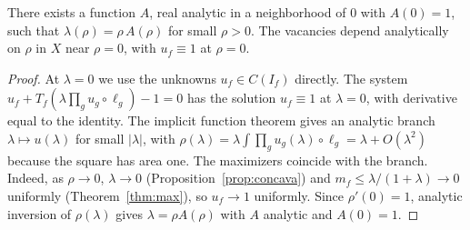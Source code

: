 \begin{proposicion}\label{prop:diluido} There exists a function $A$, real analytic in a neighborhood of $0$ with
$A(0)=1$, such that $\lambda(\rho)=\rho\,A(\rho)$ for small $\rho>0$. The vacancies depend analytically on $\rho$ in $X$ near $\rho=0$,
with $u_f\equiv1$ at $\rho=0$. \end{proposicion}

\begin{proof} At $\lambda=0$ we use the unknowns $u_f\in C(I_f)$ directly. The system $u_f+T_f(\lambda\prod_gu_g\circ\ell_g)-1=0$ has
the solution $u_f\equiv1$ at $\lambda=0$, with derivative equal to the identity. The implicit function theorem gives an analytic branch
$\lambda\mapsto u(\lambda)$ for small $|\lambda|$, with $\rho(\lambda)=\lambda\int\prod_gu_g(\lambda)\circ\ell_g=\lambda+O(\lambda^2)$
because the square has area one. The maximizers coincide with the branch. Indeed, as $\rho\to0$, $\lambda\to0$
(Proposition~\ref{prop:concava}) and $m_f\le\lambda/(1+\lambda)\to0$ uniformly (Theorem~\ref{thm:max}), so $u_f\to1$ uniformly. Since
$\rho'(0)=1$, analytic inversion of $\rho(\lambda)$ gives $\lambda=\rho A(\rho)$ with $A$ analytic and $A(0)=1$. \end{proof}
